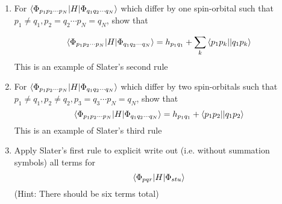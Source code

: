\documentclass{article}
\newcommand{\cd}{\ensuremath{\cdots} }
\begin{document}
\begin{enumerate}
 \item For $\braket{\Phi_{p_1 p_2 \cd p_N} | H | \Phi_{q_1 q_2 \cd q_N} }$ which differ by one spin-orbital such that $p_1 \neq q_1, p_2 = q_2 \cd p_N = q_N$, show that 
 
 \[\braket{\Phi_{p_1 p_2 \cd p_N} | H | \Phi_{q_1 q_2 \cd q_N} } = h_{p_1 q_1}  + \sum_k \braket{p_1 p_k || q_1 p_k}  \]
 This is an example of Slater's second rule
 
 \item For $\braket{\Phi_{p_1 p_2 \cd p_N} | H | \Phi_{q_1 q_2 \cd q_N} }$ which differ by two spin-orbitals such that $p_1 \neq q_1, p_2 \neq q_2, p_3 = q_3 \cd p_N = q_N$, show that
\[\braket{\Phi_{p_1 p_2 \cd p_N} | H | \Phi_{q_1 q_2 \cd q_N} } = h_{p_1 q_1}  +  \braket{p_1 p_2 || q_1 p_2}  \]
   This is an example of Slater's third rule
 \item Apply Slater's first rule to explicit write out (i.e. without summation symbols) all terms for  \[\braket{\Phi_{pqr} | H| \Phi_{stu}} \]
 (Hint: There should be six terms total)
 
\end{enumerate}
\end{document}
